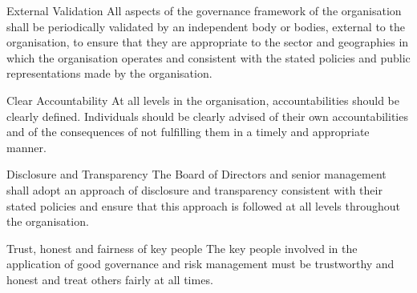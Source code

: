 External Validation 
All aspects of the governance framework of the organisation shall be periodically validated by an independent body or bodies, external to the organisation, to 
ensure that they are appropriate to the sector and  geographies in which the organisation operates and  consistent with the stated policies and public 
representations made by the organisation. 

Clear Accountability 
At all levels in the organisation, accountabilities should be clearly defined. Individuals should be clearly advised of their own accountabilities and of the 
consequences of not fulfilling them in a timely and appropriate manner. 

Disclosure and Transparency 
The Board of Directors and senior management shall adopt an approach of disclosure and transparency consistent with their stated policies and ensure that this 
approach is followed at all levels throughout the organisation. 

Trust, honest and fairness of key people 
The key people involved in the application of good governance and risk management must be trustworthy and honest and treat others fairly at all times. 
